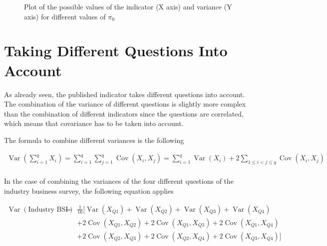 \documentclass[12pt,a4paper,oneside]{book}
\DeclareMathOperator{\Var}{Var}
\DeclareMathOperator{\Cov}{Cov}
\begin{document}
\begin{figure}[hbt!]
    \caption{Plot of the possible values of the indicator (X axis) and variance (Y axis) for different values of $\pi_0$ }
    \label{fig:var properties}
\end{figure}


\section{Taking Different Questions Into Account}

As already seen, the published indicator takes different questions into account. 
The combination of the variance of different questions is slightly more complex than the combination of different indicators since the questions are correlated, which means that covariance has to be taken into account.

The formula to combine different variances is the following

\begin{eqnarray}
\Var \left(\sum_{i=1}^{q} X_{i}\right) = \sum_{i=1}^{q} \sum_{j=1}^{q} \Cov\left(X_{i}, X_{j}\right)
= \sum_{i=1}^{q} \Var\left(X_{i}\right)+2 \sum_{1 \leq i<j \leq q} \Cov\left(X_{i}, X_{j}\right) \label{eq:sum of variances} \\ \nonumber
\end{eqnarray} 

In the case of combining the variances of the four different questions of the industry business survey, the following equation applies

\begin{eqnarray}
    \Var \left( \text{Industry BSI} \right) 
    &=& \frac{1}{16} \Big[ \Var(X_{Q1}) + \Var(X_{Q2}) + \Var(X_{Q3}) + \Var(X_{Q4}) \nonumber \\
    && + 2 \Cov (X_{Q1},X_{Q2}) + 2 \Cov (X_{Q1},X_{Q3}) + 2 \Cov (X_{Q1},X_{Q4}) \nonumber \\
    &&  + 2 \Cov (X_{Q2},X_{Q3}) + 2 \Cov (X_{Q2},X_{Q4}) + 2 \Cov (X_{Q3},X_{Q4}) \Big] \nonumber \\
\end{eqnarray}
\end{document}
